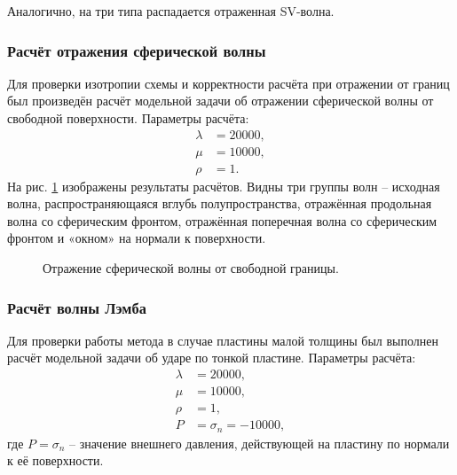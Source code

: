 Аналогично, на три типа распадается отраженная SV-волна. 

\clearpage
\newpage

\subsubsection{Расчёт отражения сферической волны}
Для проверки изотропии схемы и корректности расчёта при отражении от границ был произведён расчёт модельной задачи об отражении сферической волны от свободной поверхности. Параметры расчёта:
\begin{align}
\lambda&=20000, \nonumber\\
\mu&=10000, \nonumber\\
\rho&=1.
\end{align}
На рис. \ref{pic:sphere_wave_reflection_2d} изображены результаты расчётов. Видны три группы волн -- исходная волна, распространяющаяся вглубь полупространства, отражённая продольная волна со сферическим фронтом, отражённая поперечная волна со сферическим фронтом и «окном» на нормали к поверхности.

\begin{figure}[h]
\caption{Отражение сферической волны от свободной границы.}
\label{pic:sphere_wave_reflection_2d}
\end{figure}

\clearpage
\newpage

\subsubsection{Расчёт волны Лэмба}

Для проверки работы метода в случае пластины малой толщины был выполнен расчёт модельной задачи об ударе по тонкой пластине. Параметры расчёта:
\begin{align}
\lambda&=20000, \nonumber\\
\mu&=10000, \nonumber\\
\rho&=1, \nonumber\\
P &= \sigma_n = -10000,
\end{align}
где $P = \sigma_n$ -- значение внешнего давления, действующей на пластину по нормали к её поверхности.


